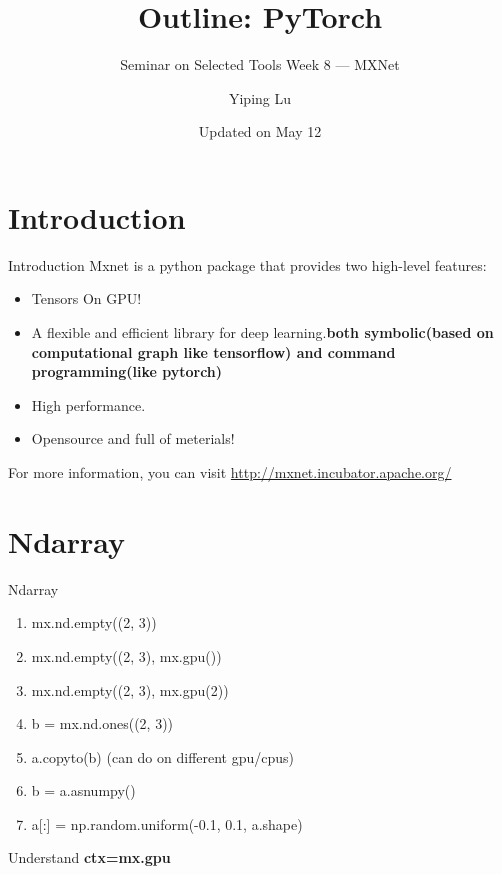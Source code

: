 \documentclass[english, nochinese]{../TeXTemplate/pkuslide}
\title{Outline: PyTorch}
\subtitle{Seminar on Selected Tools Week 8 --- MXNet}
\author{Yiping Lu}
\date{Updated on May 12}
\begin{document}
\begin{frame}
\titlepage
\end{frame}

\begin{frame}
\tableofcontents[subsectionstyle=show]
\end{frame}

\section{Introduction}

\begin{frame}
\sectionpage
\end{frame}

\begin{frame}{Introduction}
Mxnet is a python package that provides two high-level features:
\begin{itemize}
\item Tensors On GPU!
\item A flexible and efficient library for deep learning.\textbf{both symbolic(based on computational graph like tensorflow) and command programming(like pytorch)}
\item High performance.
\item Opensource and full of meterials!
\end{itemize}
For more information, you can visit \url{http://mxnet.incubator.apache.org/}
\end{frame}

\section{Ndarray}

\begin{frame}
\sectionpage
\end{frame}

\begin{frame}{Ndarray}
\begin{enumerate}
\item mx.nd.empty((2, 3)) 
\item mx.nd.empty((2, 3), mx.gpu()) 
\item mx.nd.empty((2, 3), mx.gpu(2)) 
\item b = mx.nd.ones((2, 3))
\item a.copyto(b) (can do on different gpu/cpus)
\item b = a.asnumpy() 
\item a[:] = np.random.uniform(-0.1, 0.1, a.shape)  
\end{enumerate}

Understand \textbf{ctx=mx.gpu}
\end{frame}
\end{document}
